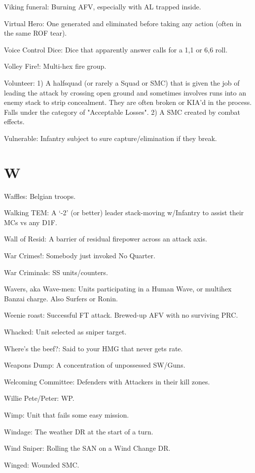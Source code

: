 \documentclass[letterpaper]{article}
\begin{document}
Viking funeral:  Burning AFV, especially with AL trapped inside.

Virtual Hero: One generated and eliminated before taking any action (often in the same ROF tear).

Voice Control Dice: Dice that apparently answer calls for a 1,1 or 6,6 roll.

Volley Fire!: Multi-hex fire group.

Volunteer: 1) A halfsquad (or rarely a Squad or SMC) that is given the job of leading the attack by crossing open ground and sometimes involves runs into an enemy stack to strip concealment. They are often broken or KIA'd in the process. Falls under the category of "Acceptable Losses". 2) A SMC created by combat effects.

Vulnerable: Infantry subject to sure capture/elimination if they break.

\section{W}

Waffles:  Belgian troops.

Walking TEM: A `-2' (or better) leader stack-moving w/Infantry to assist their MCs vs any D1F.

Wall of Resid: A barrier of residual firepower across an attack axis.

War Crimes!:  Somebody just invoked No Quarter.

War Criminals: SS units/counters.

Wavers, aka Wave-men: Units participating in a Human Wave, or multihex Banzai charge. Also Surfers or Ronin.

Weenie roast: Successful FT attack.  Brewed-up AFV with no surviving PRC.

Whacked: Unit selected as sniper target.

Where's the beef?: Said to your HMG that never gets rate.

Weapons Dump: A concentration of unpossessed SW/Guns.

Welcoming Committee: Defenders with Attackers in their kill zones.

Willie Pete/Peter: WP.

Wimp: Unit that fails some easy mission.

Windage:  The weather DR at the start of a turn. 

Wind Sniper: Rolling the SAN on a Wind Change DR.

Winged: Wounded SMC.
\end{document}
